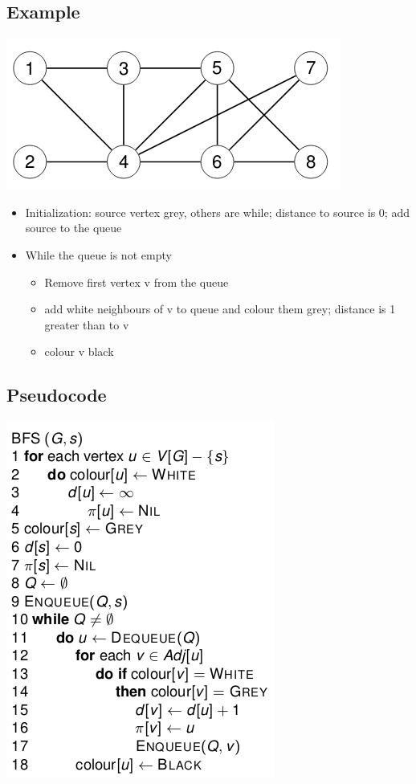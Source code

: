 \documentclass{article}[18pt]
\begin{document}
\subsection{Example}
\begin{center}
	\includegraphics[scale=0.7]{example}
\end{center}
\begin{itemize}
	\item Initialization: source vertex grey, others are while; distance to source is 0; add source to the queue
	\item While the queue is not empty
	\begin{itemize}
		\item Remove first vertex v from the queue
		\item add white neighbours of v to queue and colour them grey; distance is 1 greater than to v
		\item colour v black
	\end{itemize}
\end{itemize}
\subsection{Pseudocode}
\begin{center}
\includegraphics[scale=0.7]{BFS}
\end{center}
\end{document}
